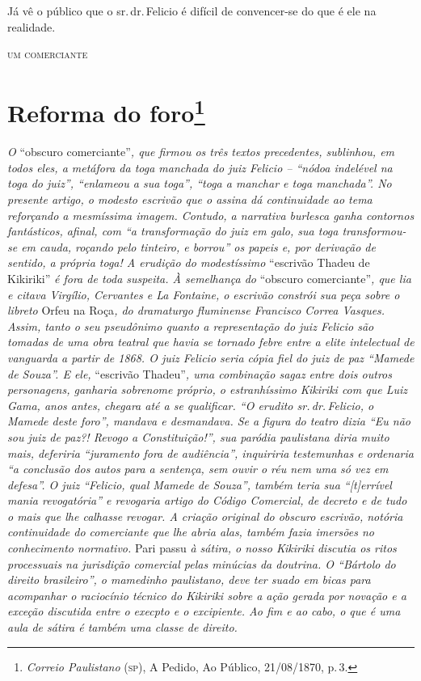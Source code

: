 Já vê o público que o sr.\,dr.\,Felicio é difícil de convencer-se do que é
ele na realidade.

\begin{flushright}
\textsc{um comerciante}
\end{flushright}

\chapter{Reforma do foro\footnote{\emph{Correio Paulistano} (\textsc{sp}), A Pedido, Ao Público,
  21/08/1870, p.\,3.}} %

\begin{didascalia}
\emph{O} ``obscuro comerciante''\emph{, que firmou os três textos
precedentes, sublinhou, em todos eles, a metáfora da toga manchada do
juiz Felicio -- ``nódoa indelével na toga do juiz'', ``enlameou a sua
toga'', ``toga a manchar e toga manchada''. No presente artigo, o modesto
escrivão que o assina dá continuidade ao tema reforçando a mesmíssima
imagem. Contudo, a narrativa burlesca ganha contornos fantásticos,
afinal, com ``a transformação do juiz em galo, sua toga transformou-se em
cauda, roçando pelo tinteiro, e borrou'' os papeis e, por derivação de
sentido, a própria toga! A erudição do modestíssimo} ``escrivão Thadeu de
Kikiriki'' \emph{é fora de toda suspeita. À semelhança do} ``obscuro
comerciante''\emph{, que lia e citava Virgílio, Cervantes e La Fontaine,
o escrivão constrói sua peça sobre o libreto} Orfeu na Roça\emph{, do
dramaturgo fluminense Francisco Correa Vasques. Assim, tanto o seu
pseudônimo quanto a representação do juiz Felicio são tomadas de uma
obra teatral que havia se tornado febre entre a elite intelectual de
vanguarda a partir de 1868. O juiz Felicio seria cópia fiel do juiz de
paz ``Mamede de Souza''. E ele,} ``escrivão Thadeu''\emph{, uma combinação
sagaz entre dois outros personagens, ganharia sobrenome próprio, o
estranhíssimo Kikiriki com que Luiz Gama, anos antes, chegara até a se
qualificar. ``O erudito sr.\,dr.\,Felicio, o Mamede deste foro'', mandava e
desmandava. Se a figura do teatro dizia ``Eu não sou juiz de paz?! Revogo
a Constituição!'', sua paródia paulistana diria muito mais, deferiria
``juramento fora de audiência'', inquiriria testemunhas e ordenaria ``a
conclusão dos autos para a sentença, sem ouvir o réu nem uma só vez em
defesa''. O juiz ``Felicio, qual Mamede de Souza'', também teria sua
``{[}t{]}errível mania revogatória'' e revogaria artigo do Código
Comercial, de decreto e de tudo o mais que lhe calhasse revogar. A
criação original do obscuro escrivão, notória continuidade do
comerciante que lhe abria alas, também fazia imersões no conhecimento
normativo.} Pari passu \emph{à sátira, o nosso Kikiriki discutia os
ritos processuais na jurisdição comercial pelas minúcias da doutrina. O
``Bártolo do direito brasileiro'', o mamedinho paulistano, deve ter suado
em bicas para acompanhar o raciocínio técnico do Kikiriki sobre a ação
gerada por novação e a exceção discutida entre o execpto e o excipiente.
Ao fim e ao cabo, o que é uma aula de sátira é também uma classe de
direito.}
\end{didascalia}

